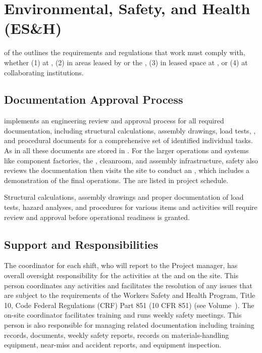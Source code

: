\section{Environmental, Safety, and Health (ES\&H)}
\label{sec:fdsp-tc-safety}

 \tcchesh of the   outlines the requirements and regulations that  work must comply with, whether (1) at , (2) in areas  leased by  or the , (3) in leased space at , or (4) at collaborating institutions.
 
\subsection{Documentation Approval Process}


 implements an engineering review and approval process for all required documentation, including structural calculations, assembly drawings, load tests, , and procedural documents for a comprehensive set of identified individual tasks. 
As in  all these documents are stored in . 
For the larger operations and systems like  component factories, the , cleanroom, and assembly infrastructure,  safety also reviews the documentation then visits the site to conduct
 an , which includes a demonstration of the final operations. The  are listed in project schedule. 
 
 Structural calculations, assembly drawings and proper documentation of  load tests, hazard analyses, and procedures for various items and activities will require review and approval before operational readiness is granted. 

 
\subsection{Support and Responsibilities}

The  coordinator for each shift, who will report to the  Project  manager, has overall  oversight responsibility for the  activities at the   and on the  site. 
This person coordinates any  activities and facilitates the resolution of any issues that are subject to the requirements of the  Workers Safety and Health Program, Title 10, Code Federal Regulations (CRF) Part 851 (10 CFR 851) (see Volume~\volnumbertc{}).  The on-site  coordinator facilitates training and runs weekly safety meetings. This  person is also responsible for managing  related  documentation including training records,  documents, weekly safety reports, records on materials-handling equipment, near-miss and accident reports, and equipment inspection. 

